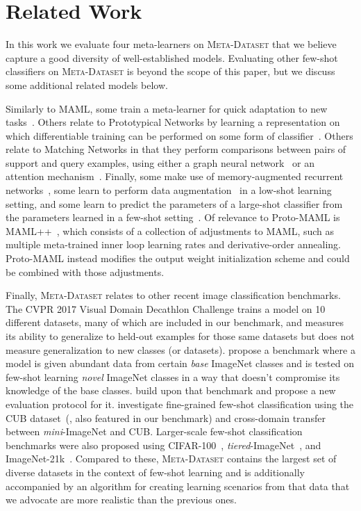 \documentclass{article} \usepackage{iclr2020_conference,times}
\newcommand{\benchmark}{\textsc{Meta-Dataset}\xspace}
\begin{document}
\section{Related Work}


In this work we evaluate four meta-learners on \benchmark 
that we believe capture a good diversity of well-established models. Evaluating other few-shot classifiers on \benchmark
is beyond the scope of this paper, but we discuss some additional related models below. 

Similarly to MAML, some train a meta-learner for quick adaptation to new
tasks~\citep{RaviS2017,munkhdalai17a,rusu2018metalearning,NIPS2018_7963}.
Others relate to Prototypical Networks by learning a representation on which
differentiable training can be performed on some form of
classifier~\citep{bertinetto2018metalearning,GidarisS2018,OreshkinB2018}.
Others relate to Matching Networks in that they perform
comparisons between pairs of support and query examples, using either a graph
neural network~\citep{garcia2018fewshot} or an attention
mechanism~\citep{mishra2018a}. Finally, some make use of memory-augmented
recurrent networks~\citep{pmlr-v48-santoro16}, some learn to perform data
augmentation~\citep{hariharan2017low,wang2018low} in a low-shot learning setting,
and some learn to predict the parameters of a large-shot classifier from the
parameters learned in a few-shot setting~\citep{wang2016learning,wang2017learning}.
Of relevance to Proto-MAML is MAML++~\citep{AntoniouA2019}, which consists of a
collection of adjustments to MAML, such as multiple meta-trained inner loop
learning rates and derivative-order annealing. Proto-MAML instead modifies the output weight initialization scheme and could be combined with those adjustments.


Finally, \benchmark relates to other recent image classification benchmarks.
The CVPR 2017 Visual Domain Decathlon Challenge trains a model on 10 different
datasets, many of which are included in our benchmark, and measures its
ability to generalize to held-out examples for those same datasets but does not measure generalization to new classes (or datasets).
\citet{hariharan2017low} propose a benchmark where a model is given abundant data from certain {\em base} ImageNet classes and is tested on few-shot learning {\em novel} ImageNet classes in a way that doesn't compromise its knowledge of the base classes. 
\citet{wang2018low} build upon that benchmark and propose a new evaluation protocol for it. 
\citet{chen2019closer} investigate fine-grained few-shot classification using the CUB
dataset~(\citealp{WahCUB_200_2011}, also featured in our benchmark) and
cross-domain transfer between {\em mini}-ImageNet and CUB. Larger-scale few-shot
classification benchmarks were also proposed using
CIFAR-100~\citep{krizhevsky2009learning,bertinetto2018metalearning,OreshkinB2018},
{\em tiered}-ImageNet~\citep{ren2018meta}, and ImageNet-21k~\citep{dhillon2019baseline}. Compared to these, \benchmark contains the largest set of diverse datasets in the context of few-shot learning and is additionally accompanied by an algorithm for creating learning scenarios from that data that we advocate are more realistic than the previous ones.
\end{document}
